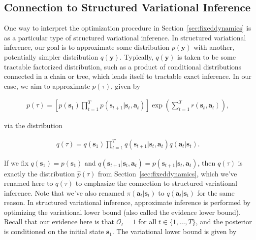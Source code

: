 \subsection{Connection to Structured Variational Inference}

One way to interpret the optimization procedure in Section~\ref{sec:fixeddynamics} is as a particular type of structured variational inference. In structured variational inference, our goal is to approximate some distribution $p(\mathbf{y})$ with another, potentially simpler distribution $q(\mathbf{y})$. Typically, $q(\mathbf{y})$ is taken to be some tractable factorized distribution, such as a product of conditional distributions connected in a chain or tree, which lends itself to tractable exact inference. In our case, we aim to approximate $p(\tau)$, given by

\begin{align}
p(\tau) = \left[ p(\mathbf{s}_1) \prod_{t=1}^T p(\mathbf{s}_{t+1}|\mathbf{s}_t,\mathbf{a}_t) \right] \exp\left( \sum_{t=1}^T r(\mathbf{s}_t,\mathbf{a}_t) \right),\label{eq:variationaltrajdistrotarget}
\end{align}

via the distribution

\begin{align}
q(\tau) = q(\mathbf{s}_1) \prod_{t=1}^T q(\mathbf{s}_{t+1}|\mathbf{s}_t,\mathbf{a}_t) q(\mathbf{a}_t|\mathbf{s}_t).\label{eq:variationaltrajdistropol}
\end{align}

If we fix $q(\mathbf{s}_1) = p(\mathbf{s}_1)$ and $q(\mathbf{s}_{t+1}|\mathbf{s}_t,\mathbf{a}_t) = p(\mathbf{s}_{t+1}|\mathbf{s}_t,\mathbf{a}_t)$, then $q(\tau)$ is exactly the distribution $\hat{p}(\tau)$ from Section~\ref{sec:fixeddynamics}, which we've renamed here to $q(\tau)$ to emphasize the connection to structured variational inference. Note that we've also renamed $\pi(\mathbf{a}_t|\mathbf{s}_t)$ to $q(\mathbf{a}_t|\mathbf{s}_t)$ for the same reason. In structured variational inference, approximate inference is performed by optimizing the variational lower bound (also called the evidence lower bound). Recall that our evidence here is that $\mathcal{O}_t = 1$ for all $t \in \{1,\dots,T\}$, and the posterior is conditioned on the initial state $\mathbf{s}_1$. The variational lower bound is given by

